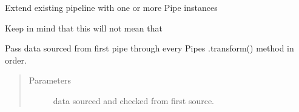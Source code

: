 \documentclass[letterpaper,10pt,english]{sphinxmanual}
\begin{document}
\begin{fulllineitems}
\begin{fulllineitems}
\end{fulllineitems}


\begin{fulllineitems}
\label{\detokenize{dalio.pipe:dalio.pipe.PipeLine.extend}}
Extend existing pipeline with one or more Pipe instances

Keep in mind that this will not mean that

\end{fulllineitems}


\begin{fulllineitems}
\label{\detokenize{dalio.pipe:dalio.pipe.PipeLine.transform}}
Pass data sourced from first pipe through every Pipe\textasciigrave{}s
.transform() method in order.
\begin{quote}\begin{description}
\item[{Parameters}] \leavevmode
{} \textendash{} data sourced and checked from first source.

\end{description}\end{quote}

\end{fulllineitems}


\end{fulllineitems}

\end{document}

